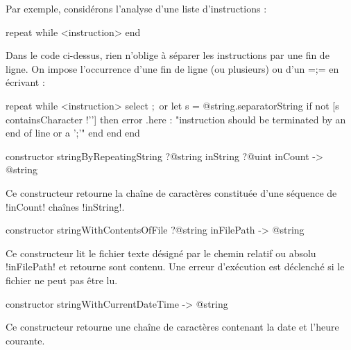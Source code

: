 Par exemple, considérons l'analyse d'une liste d'instructions :

\begin{galgas}
repeat
while
  <instruction>
end
\end{galgas}

Dans le code ci-dessus, rien n'oblige à séparer les instructions par une fin de ligne. On impose l'occurrence d'une fin de ligne (ou plusieurs) ou d'un \ggs=;= en écrivant :

\begin{galgas}
repeat
while
  <instruction>
  select
   $;$
  or
    let s = @string.separatorString 
    if not [s containsCharacter !'\n'] then
      error .here
       : "instruction should be terminated by an end of line or a ';'"
    end
  end
end
\end{galgas}




\begin{galgasbox}
constructor stringByRepeatingString
  ?@string inString
  ?@uint inCount
  -> @string
\end{galgasbox}

Ce constructeur retourne la chaîne de caractères constituée d'une séquence de \ggs!inCount! chaînes \ggs!inString!.









\begin{galgasbox}
constructor stringWithContentsOfFile ?@string inFilePath -> @string
\end{galgasbox}

Ce constructeur lit le fichier texte désigné par le chemin relatif ou absolu \ggs!inFilePath! et retourne sont contenu. Une erreur d'exécution est déclenché si le fichier ne peut pas être lu.







\begin{galgasbox}
constructor stringWithCurrentDateTime -> @string
\end{galgasbox}

Ce constructeur retourne une chaîne de caractères contenant la date et l'heure courante.

